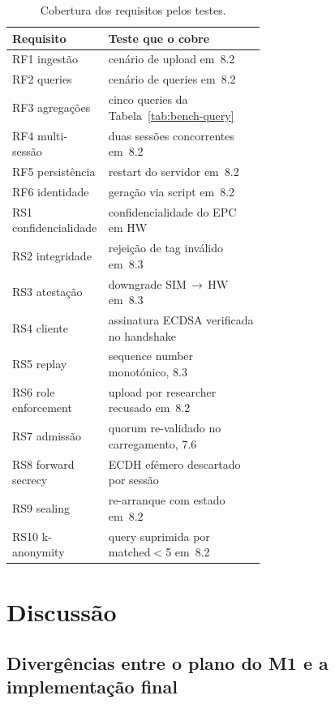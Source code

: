 \begin{table}[H]
\centering
\small
\begin{tabular}{lp{0.62\linewidth}}
\toprule
Requisito & Teste que o cobre \\
\midrule
RF1 ingestão        & cenário de upload em~8.2 \\
RF2 queries         & cenário de queries em~8.2 \\
RF3 agregações      & cinco queries da Tabela~\ref{tab:bench-query} \\
RF4 multi-sessão    & duas sessões concorrentes em~8.2 \\
RF5 persistência    & restart do servidor em~8.2 \\
RF6 identidade      & geração via script em~8.2 \\
RS1 confidencialidade & confidencialidade do EPC em HW \\
RS2 integridade     & rejeição de tag inválido em~8.3 \\
RS3 atestação       & downgrade SIM\,$\to$\,HW em~8.3 \\
RS4 cliente         & assinatura ECDSA verificada no handshake \\
RS5 replay          & sequence number monotónico, 8.3 \\
RS6 role enforcement& upload por researcher recusado em~8.2 \\
RS7 admissão        & quorum re-validado no carregamento, 7.6 \\
RS8 forward secrecy & ECDH efémero descartado por sessão \\
RS9 sealing         & re-arranque com estado em~8.2 \\
RS10 k-anonymity    & query suprimida por matched$<$5 em~8.2 \\
\bottomrule
\end{tabular}
\caption{Cobertura dos requisitos pelos testes.}
\label{tab:reqs-coverage}
\end{table}

\section{Discussão}

\subsection{Divergências entre o plano do M1 e a implementação final}

